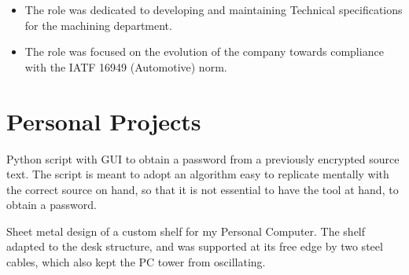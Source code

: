 \documentclass[a4paper, 12pt]{my_cv}
\newlength\MainWidth
\begin{document}
\begin{textblock*}{\MainWidth}
          
    \begin{itemize}
        \item {}

    The role was dedicated to developing and maintaining Technical specifications for the machining department.

        \item {}

    The role was focused on the evolution of the company towards compliance with the IATF 16949 (Automotive) norm.
    \end{itemize}

    \section*{Personal Projects}

    
    Python script with GUI to obtain a password from a previously encrypted source text. The script is meant to adopt an algorithm easy to replicate mentally with the correct source on hand, so that it is not essential to have the tool at hand, to obtain a password.

    
    Sheet metal design of a custom shelf for my Personal Computer. The shelf adapted to the desk structure, and was supported at its free edge by two steel cables, which also kept the PC tower from oscillating.
    
\end{textblock*}
\end{document}
